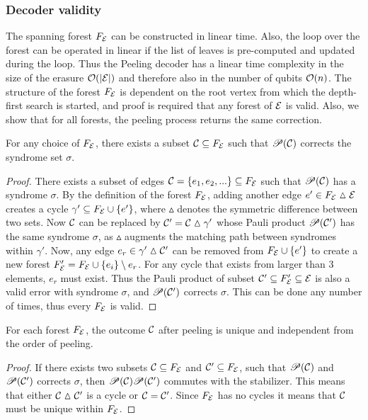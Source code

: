 \subsubsection{Decoder validity}
The spanning forest $F_{\mathcal{E}}$ can be constructed in linear time. Also, the loop over the forest can be operated in linear if the list of leaves is pre-computed and updated during the loop. Thus the Peeling decoder has a linear time complexity in the size of the erasure $\mathcal{O}(\abs{\mathcal{E}})$ and therefore also in the number of qubits $\mathcal{O}(n)$. The structure of the forest $F_{\mathcal{E}}$ is dependent on the root vertex from which the depth-first search is started, and proof is required that any forest of $\mathcal{E}$ is valid. Also, we show that for all forests, the peeling process returns the same correction.

\begin{lemma}\label{lem:anyforest}
  For any choice of $F_{\mathcal{E}}$, there exists a subset $\mathcal{C}\subseteq F_{\mathcal{E}}$ such that $\mathscr{P}(\mathcal{C})$ corrects the syndrome set $\sigma$.
\end{lemma}
\begin{proof}
  There exists a subset of edges $\mathcal{C} = \{e_1,e_2,...\} \subseteq F_{\mathcal{E}}$ such that $\mathscr{P}(\mathcal{C})$ has a syndrome $\sigma$. By the definition of the forest $F_{\mathcal{E}}$, adding another edge $e' \in F_{\mathcal{E}} \vartriangle \mathcal{E}$ creates a cycle $\gamma' \subseteq F_{\mathcal{E}} \cup \{e'\}$, where $\vartriangle$ denotes the symmetric difference between two sets. Now $\mathcal{C}$ can be replaced by $\mathcal{C}'=\mathcal{C}\vartriangle\gamma'$ whose Pauli product $\mathscr{P}(\mathcal{C}')$ has the same syndrome $\sigma$, as $\vartriangle$ augments the matching path between syndromes within $\gamma'$. Now, any edge $e_r\in \gamma' \vartriangle \mathcal{C}'$ can be removed from $F_{\mathcal{E}} \cup \{e'\}$ to create a new forest $F_{\mathcal{E}}'=F_{\mathcal{E}} \cup \{e_i\}\setminus e_r$. For any cycle that exists from larger than 3 elements, $e_r$ must exist. Thus the Pauli product of subset $\mathcal{C}' \subseteq F_{\mathcal{E}}'\subseteq \mathcal{E}$ is also a valid error with syndrome $\sigma$, and $\mathscr{P}(\mathcal{C}')$ corrects $\sigma$. This can be done any number of times, thus every $F_{\mathcal{E}}$ is valid.
\end{proof}
\begin{lemma}\label{lem:peelingfe}
  For each forest $F_{\mathcal{E}}$, the outcome $\mathcal{C}$ after peeling is unique and independent from the order of peeling.
\end{lemma}
\begin{proof}
  If there exists two subsets $\mathcal{C}\subseteq F_{\mathcal{E}}$ and $\mathcal{C}' \subseteq F_{\mathcal{E}}$, such that $\mathscr{P}(\mathcal{C})$ and $\mathscr{P}(\mathcal{C}')$ corrects $\sigma$, then $\mathscr{P}(\mathcal{C})\mathscr{P}(\mathcal{C}')$ commutes with the stabilizer. This means that either $\mathcal{C}\vartriangle\mathcal{C}'$ is a cycle or $\mathcal{C}=\mathcal{C}'$. Since $F_{\mathcal{E}}$ has no cycles it means that $\mathcal{C}$ must be unique within $F_{\mathcal{E}}$.
\end{proof}

